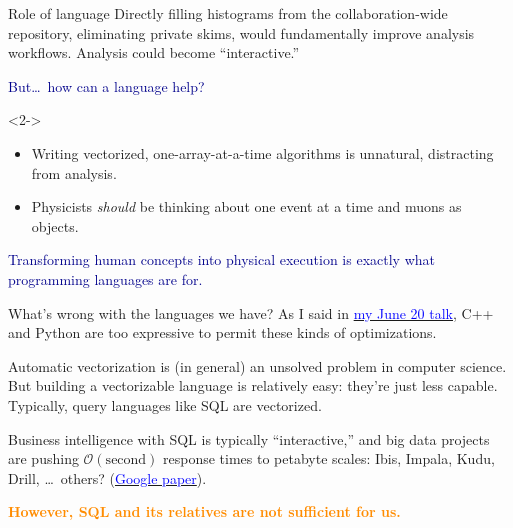 \documentclass{beamer}
\begin{document}
\begin{frame}{Role of language}
\vspace{0.5 cm}
Directly filling histograms from the collaboration-wide repository, eliminating private skims, would fundamentally improve analysis workflows. Analysis could become ``interactive.''

\vspace{0.5 cm}
\textcolor{darkblue}{But\ldots\ how can a language help?}

\begin{uncoverenv}<2->
\vspace{0.3 cm}
\begin{itemize}
\item Writing vectorized, one-array-at-a-time algorithms is unnatural, distracting from analysis.
\item Physicists {\it should} be thinking about one event at a time and muons as objects.
\end{itemize}

\vspace{0.3 cm}
\textcolor{darkblue}{Transforming human concepts into physical execution is exactly what programming languages are for.}
\end{uncoverenv}
\end{frame}

\begin{frame}{What's wrong with the languages we have?}
\vspace{0.25 cm}
As I said in \href{https://indico.cern.ch/event/544650/}{\textcolor{blue}{my June 20 talk}}, C++ and Python are too expressive to permit these kinds of optimizations.

\vspace{0.5 cm}
Automatic vectorization is (in general) an unsolved problem in computer science. But building a vectorizable language is relatively easy: they're just less capable. Typically, query languages like SQL are vectorized.

\vspace{0.5 cm}
Business intelligence with SQL is typically ``interactive,'' and big data projects are pushing $\mathcal{O}(\mbox{second})$ response times to petabyte scales: Ibis, Impala, Kudu, Drill, \ldots\ others? (\href{http://research.google.com/pubs/pub36632.html}{\textcolor{blue}{Google paper}}).

\vspace{0.5 cm}
\textcolor{darkorange}{\bf However, SQL and its relatives are not sufficient for us.}
\end{frame}
\end{document}
